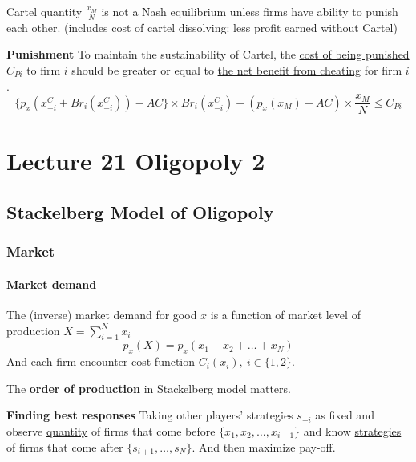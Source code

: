 \documentclass[]{article}
\begin{document}
                \begin{remark}
                    Cartel quantity $\frac{x_M}{N}$ is not a Nash equilibrium unless firms have ability to punish each other. (includes cost of cartel dissolving: less profit earned without Cartel)
                \end{remark}
                
                \begin{remark} \textbf{Punishment}
                    To maintain the sustainability of Cartel, the \ul{cost of being punished}$C_{Pi}$ to firm $i$ should be greater or equal to \ul{the net benefit from cheating} for firm $i$.
                    \[
                        \big \{ p_x(x_{-i}^C + Br_i(x_{-i}^C)) - AC \big \} \times Br_i(x_{-i}^C) - (p_x(x_M) - AC) \times \frac{x_M}{N} \leq C_{Pi}
                    \]
                \end{remark}
                
    \section{Lecture 21 Oligopoly 2}
        \subsection{Stackelberg Model of Oligopoly}
            \subsubsection{Market}
                \paragraph{Market demand} The (inverse) market demand for good $x$ is a function of market level of production $X = \sum_{i=1}^N{x_i}$
                \[
                    p_x(X) = p_x(x_1 + x_2 + \dots + x_N)
                \]
                And each firm encounter cost function $C_i(x_i),\ i \in \{1, 2\}$.
                
                \begin{remark}
                    The \textbf{order of production} in Stackelberg model matters.
                \end{remark}
                
                \begin{remark}
                    \textbf{Finding best responses}
                    Taking other players' strategies $s_{-i}$ as fixed and observe \ul{quantity} of firms that come before $\{x_1, x_2, \dots, x_{i-1}\}$ and know \ul{strategies} of firms that come after $\{s_{i+1}, \dots, s_N\}$. And then maximize pay-off.
                \end{remark}
            
\end{document}
